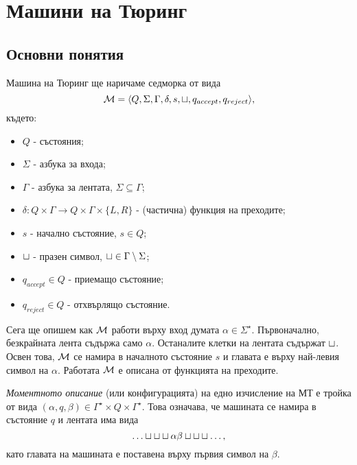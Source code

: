 \chapter{Машини на Тюринг}

\newcommand{\tape}[1]{\dots\blank\blank\blank{#1}\blank\blank\blank\dots}
\section{Основни понятия}
Машина на Тюринг ще наричаме седморка от вида 
\[\mathcal{M} = \langle{Q,\Sigma,\Gamma,\delta,s,\sqcup,q_{accept}, q_{reject}}\rangle,\] където:
\begin{itemize}
\item 
  $Q$ - състояния;
\item
  $\Sigma$ - азбука за входа;
\item
  $\Gamma$ - азбука за лентата, $\Sigma \subseteq \Gamma$;
\item
  $\delta:Q\times\Gamma \to Q\times \Gamma \times \{L,R\}$ - (частична) функция на преходите;
\item
  $s$ - начално състояние, $s \in Q$;
\item
  $\sqcup$ - празен символ,  $\sqcup \in \Gamma \setminus \Sigma$;
\item
  $q_{accept} \in Q$ - приемащо състояние;
\item
  $q_{reject} \in Q$ - отхвърлящо състояние.
\end{itemize}

Сега ще опишем как $\mathcal{M}$ работи върху вход думата $\alpha \in \Sigma^\star$.
Първоначално, безкрайната лента съдържа само $\alpha$. Останалите клетки на лентата съдържат $\sqcup$.
Освен това, $\mathcal{M}$ се намира в началното състояние $s$ и главата е върху най-левия символ на $\alpha$.
Работата $\mathcal{M}$ е описана от функцията на преходите.
  
{\em Моментното описание} (или конфигурацията) на едно изчисление на МТ е тройка от вида $(\alpha, q, \beta) \in \Gamma^\star\times Q \times \Gamma^\star$. Това означава, че
машината се намира в състояние $q$ и лентата има вида
\[\tape{\alpha\beta},\]
като главата на машината е поставена върху първия символ на $\beta$.

